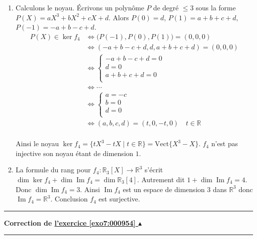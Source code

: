 \documentclass[11pt,a4paper]{article}
\newcommand{\Rr}{\mathbb{R}} \newcommand{\R}{\mathbb{R}}
\renewcommand{\Im}{\mathop{\mathrm{Im}}\nolimits}
\renewcommand{\le}{\leqslant} \renewcommand{\leq}{\leqslant}
\newcounter{exo}
\newcommand{\correction}[1]{\hypertarget{cor7:#1}{}\label{cor7:#1}{\bf Correction de \hyperlink{exo7:#1}{l'exercice \ref{exo7:#1} $\blacktriangle$}}\vspace{1mm}\hrule\vspace{1mm}}
\newcommand{\fincorrection}{\vspace{1mm}\hrule\vspace*{7mm}}
\begin{document}
\begin{enumerate}
\begin{enumerate}
  \item Calculons le noyau. \'Ecrivons un polynôme $P$ de degré $\le 3$ sous la forme
$P(X)= aX^3+bX^2+cX+d$. Alors $P(0) = d$, $P(1)=a+b+c+d$, $P(-1)=-a+b-c+d$.
\begin{align*}
P(X) \in \ker f_4 
  & \iff \big( P(-1), P(0), P(1) \big)= (0,0,0)  \\
  & \iff (-a+b-c+d,d,a+b+c+d) = (0,0,0) \\
  &\iff \begin{cases}
          -a+b-c+d = 0 \\
          d = 0 \\   
          a+b+c+d = 0 \\ 
        \end{cases}\\
 & \iff \cdots \\
 & \iff \begin{cases}
          a = -c \\
          b = 0 \\  
          d = 0 \\ 
        \end{cases} \\
  & \iff (a,b,c,d)=(t,0,-t,0) \quad t\in\Rr \\
  \end{align*}

Ainsi le noyau $\ker f_4 = \big\{ tX^3 - tX \mid t\in \Rr\big\} = \text{Vect}\{ X^3-X \}$.
$f_4$ n'est pas injective son noyau étant de dimension $1$.

  \item La formule du rang pour $f_4 : \Rr_3[X] \to \Rr^3$ s'écrit 
$\dim \ker f_4 + \dim \Im f_4 = \dim \Rr_3[4]$. Autrement dit
$1+ \dim \Im f_4 = 4$. Donc $\dim \Im f_4 = 3$. 
Ainsi $\Im f_4$ est un espace de dimension $3$ dans $\Rr^3$ donc 
$\Im f_4=\Rr^3$. Conclusion $f_4$ est surjective.
  \end{enumerate}

\end{enumerate}
\fincorrection
\correction{000954}
\end{document}
